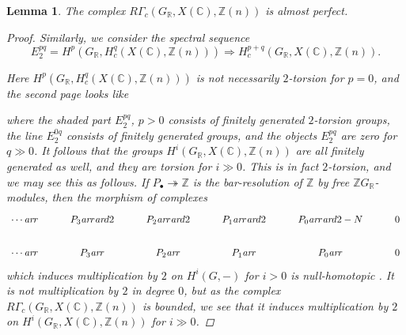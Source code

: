 \documentclass[draft,leqno,12pt]{article}
\theoremstyle{plain}
\newtheorem{lemma}[theorem]{\indent\sc Lemma}
\theoremstyle{definition}
\newcommand{\ZZ}{\mathbb{Z}}
\newcommand{\RR}{\mathbb{R}}
\newcommand{\CC}{\mathbb{C}}
\newcommand{\ar}{\text{\it ar}}
\begin{document}
\begin{lemma}
  \label{lemma:RGammac(GR,X(C),Z(n))-almost-perfect}
  The complex $R\Gamma_c (G_\RR, X (\CC), \ZZ (n))$
  is almost perfect.

  \begin{proof}
    Similarly, we consider the spectral sequence
    \[ E_2^{pq} = H^p (G_\RR, H^q_c (X (\CC), \ZZ (n)))
    \Longrightarrow
    H^{p+q}_c (G_\RR, X (\CC), \ZZ (n)). \]

    Here $H^p (G_\RR, H^q_c (X (\CC), \ZZ (n)))$ is not necessarily $2$-torsion
    for $p = 0$, and the second page looks like
    \begin{center}
    \end{center}
    where the shaded part $E_2^{pq}$, $p > 0$ consists of finitely generated
    $2$-torsion groups, the line $E_2^{0q}$ consists of finitely generated
    groups, and the objects $E_2^{pq}$ are zero for $q \gg 0$. It follows that
    the groups $H^i (G_\RR, X (\CC), \ZZ (n))$ are all finitely generated as
    well, and they are torsion for $i \gg 0$. This is in fact $2$-torsion, and
    we may see this as follows. If $P_\bullet \twoheadrightarrow \ZZ$ is the
    bar-resolution of $\ZZ$ by free $\ZZ G_\RR$-modules, then the morphism of
    complexes
    \[ \begin{tikzcd}
      \cdots\ar{r} & P_3\ar{r}\ar{d}{2} & P_2\ar{r}\ar{d}{2} & P_1\ar{r}\ar{d}{2} & P_0\ar{r}\ar{d}{2-N} & 0 \\
      \cdots\ar{r} & P_3\ar{r} & P_2\ar{r} & P_1\ar{r} & P_0\ar{r} & 0
    \end{tikzcd} \]
    which induces multiplication by $2$ on $H^i (G,-)$ for $i > 0$
    is null-homotopic \cite[Theorem 6.5.8]{Weibel-1994}. It is not
    multiplication by $2$ in degree $0$, but as the complex
    $R\Gamma_c (G_\RR, X (\CC), \ZZ (n))$ is bounded, we see that it induces
    multiplication by $2$ on $H^i (G_\RR, X (\CC), \ZZ (n))$ for $i \gg 0$.
  \end{proof}
\end{lemma}
\end{document}
